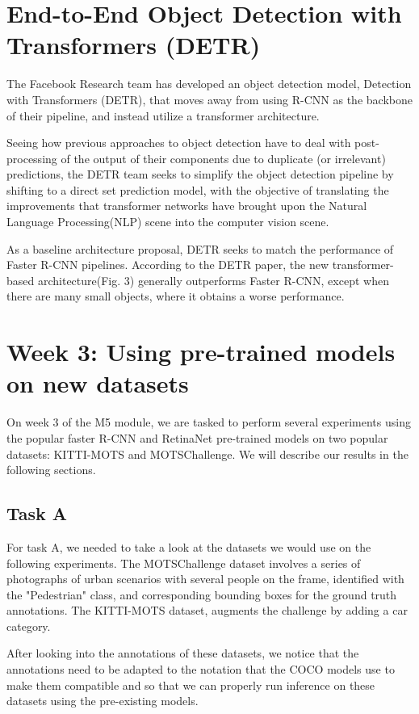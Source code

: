 \documentclass[12pt,a4paper,twocolumn,twoside]{article}
\begin{document}
\section{End-to-End Object Detection with Transformers (DETR)}
The Facebook Research team has developed an object detection model, Detection with Transformers (DETR)\cite{carion_massa_synnaeve_usunier_kirillov_zagoruyko_2020}, that moves away from using R-CNN as the backbone of their pipeline, and instead utilize a transformer architecture. 

Seeing how previous approaches to object detection have to deal with post-processing of the output of their components due to duplicate (or irrelevant) predictions, the DETR team seeks to simplify the object detection pipeline by shifting to a direct set prediction model, with the objective of translating the improvements that transformer networks have brought upon the Natural Language Processing(NLP) scene into the computer vision scene.

As a baseline architecture proposal, DETR seeks to match the performance of Faster R-CNN pipelines. According to the DETR paper, the new transformer-based architecture(Fig. 3) generally outperforms Faster R-CNN, except when there are many small objects, where it obtains a worse performance.

\section{Week 3: Using pre-trained models on new datasets}

On week 3 of the M5 module, we are tasked to perform several experiments using 
the popular faster R-CNN and RetinaNet pre-trained models on two popular
datasets: KITTI-MOTS and MOTSChallenge. We will describe our results in the 
following sections.

\subsection{Task A}

For task A, we needed to take a look at the datasets we would use on the 
following experiments. The MOTSChallenge dataset involves a series of 
photographs of urban scenarios with several people on the frame,
identified with the "Pedestrian" class, and corresponding bounding boxes
for the ground truth annotations. The KITTI-MOTS dataset, augments the
challenge by adding a car category.

After looking into the annotations of these datasets, we notice that
the annotations need to be adapted to the notation that the COCO models
use to make them compatible and so that we can properly run inference on
these datasets using the pre-existing models.
\end{document}
